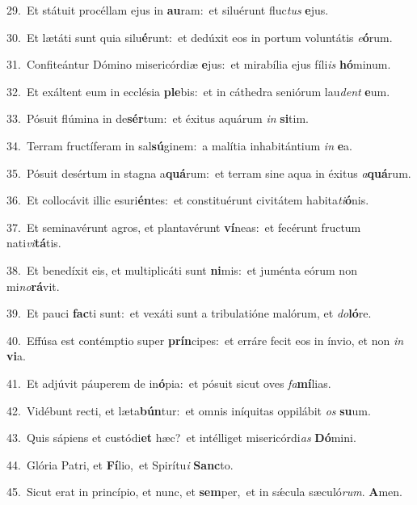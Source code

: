 {\numbfont\textcolor{\numbcolor}{29.}}~Et státuit procéllam ejus in \textbf{au}\-ram:~\star et siluérunt fluc\textit{tus} \textbf{e}\-jus.\par
{\numbfont\textcolor{\numbcolor}{30.}}~Et lætáti sunt quia silu\-\textbf{é}\-runt:~\star et dedúxit eos in portum voluntátis \textit{e}\-\textbf{ó}rum.\par
{\numbfont\textcolor{\numbcolor}{31.}}~Confiteántur Dómino misericórdiæ \textbf{e}\-jus:~\star et mirabília ejus fíli\textit{is} \textbf{hó}\-minum.\par
{\numbfont\textcolor{\numbcolor}{32.}}~Et exáltent eum in ecclésia \textbf{ple}\-bis:~\star et in cáthedra seniórum lau\textit{dent} \textbf{e}\-um.\par
{\numbfont\textcolor{\numbcolor}{33.}}~Pósuit flúmina in de\-\textbf{sér}\-tum:~\star et éxitus aquárum \textit{in} \textbf{si}\-tim.\par
{\numbfont\textcolor{\numbcolor}{34.}}~Terram fructíferam in sal\-\textbf{sú}\-ginem:~\star a malítia inhabitántium \textit{in} \textbf{e}\-a.\par
{\numbfont\textcolor{\numbcolor}{35.}}~Pósuit desértum in stagna a\-\textbf{quá}\-rum:~\star et terram sine aqua in éxitus \textit{a}\-\textbf{quá}rum.\par
{\numbfont\textcolor{\numbcolor}{36.}}~Et collocávit illic esuri\-\textbf{én}\-tes:~\star et constituérunt civitátem habita\-\textit{ti}\-\textbf{ó}nis.\par
{\numbfont\textcolor{\numbcolor}{37.}}~Et seminavérunt agros, et plantavérunt \textbf{ví}\-neas:~\star et fecérunt fructum nati\-\textit{vi}\-\textbf{tá}tis.\par
{\numbfont\textcolor{\numbcolor}{38.}}~Et benedíxit eis, et multiplicáti sunt \textbf{ni}\-mis:~\star et juménta eórum non mi\-\textit{no}\-\textbf{rá}vit.\par
{\numbfont\textcolor{\numbcolor}{39.}}~Et pauci \textbf{fac}\-ti sunt:~\star et vexáti sunt a tribulatióne malórum, et \textit{do}\-\textbf{ló}re.\par
{\numbfont\textcolor{\numbcolor}{40.}}~Effúsa est contémptio super \textbf{prín}\-cipes:~\star et erráre fecit eos in ínvio, et non \textit{in} \textbf{vi}\-a.\par
{\numbfont\textcolor{\numbcolor}{41.}}~Et adjúvit páuperem de in\-\textbf{ó}\-pia:~\star et pósuit sicut oves \textit{fa}\-\textbf{mí}lias.\par
{\numbfont\textcolor{\numbcolor}{42.}}~Vidébunt recti, et læta\-\textbf{bún}\-tur:~\star et omnis iníquitas oppilábit \textit{os} \textbf{su}\-um.\par
{\numbfont\textcolor{\numbcolor}{43.}}~Quis sápiens et custódi\textbf{et} hæc?~\star et intélliget misericórdi\textit{as} \textbf{Dó}\-mini.\par
{\numbfont\textcolor{\numbcolor}{44.}}~Glória Patri, et \textbf{Fí}\-lio,~\star et Spirítu\textit{i} \textbf{Sanc}\-to.\par
{\numbfont\textcolor{\numbcolor}{45.}}~Sicut erat in princípio, et nunc, et \textbf{sem}\-per,~\star et in sǽcula sæculó\-\textit{rum}\-. \textbf{A}\-men.\par
